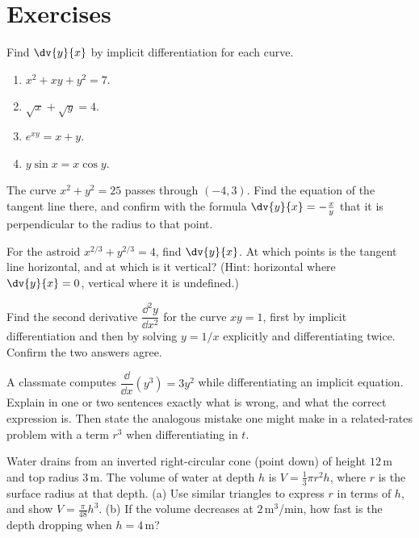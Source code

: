 \section{Exercises}
\label{ch13:exercises}

\begin{exercise}
Find $\dv{y}{x}$ by implicit differentiation for each curve.
\begin{enumerate}[label=(\alph*)]
\item $x^2 + xy + y^2 = 7$.
\item $\sqrt{x} + \sqrt{y} = 4$.
\item $e^{xy} = x + y$.
\item $y\sin x = x\cos y$.
\end{enumerate}
\end{exercise}

\begin{exercise}
The curve $x^2 + y^2 = 25$ passes through $(-4,3)$. Find the equation of the tangent line there, and
confirm with the formula $\dv{y}{x} = -\tfrac{x}{y}$ that it is perpendicular to the radius to that
point.
\end{exercise}

\begin{exercise}
For the astroid $x^{2/3} + y^{2/3} = 4$, find $\dv{y}{x}$. At which points is the tangent line
horizontal, and at which is it vertical? (Hint: horizontal where $\dv{y}{x}=0$, vertical where it is
undefined.)
\end{exercise}

\begin{exercise}
Find the second derivative $\dfrac{\dd^2 y}{\dd x^2}$ for the curve $xy = 1$, first by implicit
differentiation and then by solving $y = 1/x$ explicitly and differentiating twice. Confirm the two
answers agree.
\end{exercise}

\begin{exercise}[Conceptual]
A classmate computes $\dfrac{\dd}{\dd x}(y^3) = 3y^2$ while differentiating an implicit equation.
Explain in one or two sentences exactly what is wrong, and what the correct expression is. Then state
the analogous mistake one might make in a related-rates problem with a term $r^3$ when differentiating
in $t$.
\end{exercise}

\begin{exercise}
Water drains from an inverted right-circular cone (point down) of height $12$\,m and top radius
$3$\,m. The volume of water at depth $h$ is $V = \tfrac{1}{3}\pi r^2 h$, where $r$ is the surface
radius at that depth. (a) Use similar triangles to express $r$ in terms of $h$, and show $V =
\tfrac{\pi}{48}h^3$. (b) If the volume decreases at $2$\,m$^3$/min, how fast is the depth dropping
when $h = 4$\,m?
\end{exercise}

